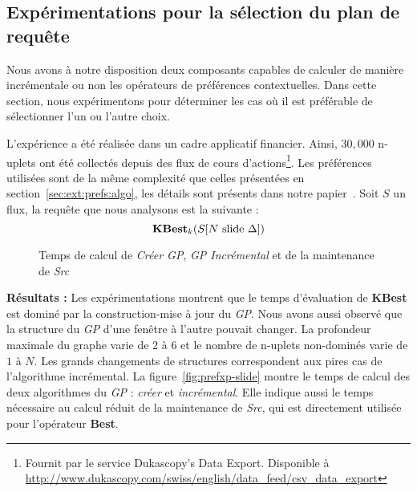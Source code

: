 \subsection{Expérimentations pour la sélection du plan de requête}
Nous avons à notre disposition deux composants capables de calculer de manière incrémentale ou non les opérateurs de préférences contextuelles. Dans cette section, nous expérimentons pour déterminer les cas où il est préférable de sélectionner l'un ou l'autre choix.

L'expérience a été réalisée dans un cadre applicatif financier. Ainsi, $30,000$ n-uplets ont été collectés depuis des flux de cours d'actions\footnote{Fournit par le service Dukascopy's Data Export. Disponible à \url{http://www.dukascopy.com/swiss/english/data_feed/csv_data_export}}. Les préférences utilisées sont de la même complexité que celles présentées en section~\ref{sec:ext:prefs:algo}, les détails sont présents dans notre papier~\cite{Petit:topk}. Soit $S$ un flux, la requête que nous analysons est la suivante : $${\bf KBest}_k(S[N \textrm{ slide } \Delta])$$

\begin{figure}[ht]
\caption{Temps de calcul de \textit{Créer GP}, \textit{GP Incrémental} et de la maintenance de \textit{Src}}\label{fig:prefxp}
\end{figure}

\textbf{Résultats :} Les expérimentations montrent que le temps d'évaluation de \textbf{KBest} est dominé par la construction-mise à jour du \textit{GP}. Nous avons aussi observé que la structure du \textit{GP} d'une fenêtre à l'autre pouvait changer. La profondeur maximale du graphe varie de 2 à 6 et le nombre de n-uplets non-dominés varie de $1$ à $N$. Les grands changements de structures correspondent aux pires cas de l'algorithme incrémental. La figure~\ref{fig:prefxp-slide} montre le temps de calcul des deux algorithmes du \textit{GP} : \textit{créer} et \textit{incrémental}. Elle indique aussi le temps nécessaire au calcul réduit de la maintenance de \textit{Src}, qui est directement utilisée pour l'opérateur \textbf{Best}. 

